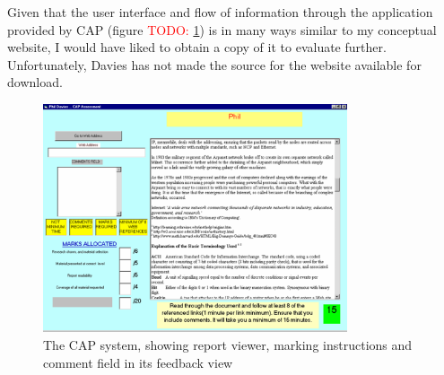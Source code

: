 \documentclass[a4paper,11pt]{report}
\newcommand{\todo}[1]{\textcolor{red}{TODO: #1}}
\begin{document}
Given that the user interface and flow of information through the application provided by CAP (figure \todo{\ref{fig:cap}}) is in many ways similar to my conceptual website, I would have liked to obtain a copy of it to evaluate further. Unfortunately, Davies has not made the source for the website available for download.\par
\begin{figure}[ht]
\centering
\includegraphics[width=0.8\textwidth]{fig/CAP.png}
\caption{\footnotesize The CAP system, showing report viewer, marking instructions and comment field in its feedback view}
\label{fig:cap}
\end{figure}
\end{document}
